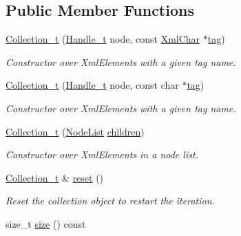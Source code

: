 \subsection*{Public Member Functions}
\begin{DoxyCompactItemize}
\item 
\hyperlink{class_d_d4hep_1_1_x_m_l_1_1_collection__t_a46561de1f154c3b06435766504b9d3db}{Collection\+\_\+t} (\hyperlink{class_d_d4hep_1_1_x_m_l_1_1_handle__t}{Handle\+\_\+t} node, const \hyperlink{namespace_d_d4hep_1_1_x_m_l_a09e5d9cc86ed782f6826dfe0778c1815}{Xml\+Char} $\ast$\hyperlink{class_d_d4hep_1_1_x_m_l_1_1_handle__t_ac935379eb28cd33bc36f19c68da66143}{tag})
\begin{DoxyCompactList}\small\item\em Constructor over Xml\+Elements with a given tag name. \end{DoxyCompactList}\item 
\hyperlink{class_d_d4hep_1_1_x_m_l_1_1_collection__t_a65effa5c14bd2aef11552cc9737022f9}{Collection\+\_\+t} (\hyperlink{class_d_d4hep_1_1_x_m_l_1_1_handle__t}{Handle\+\_\+t} node, const char $\ast$\hyperlink{class_d_d4hep_1_1_x_m_l_1_1_handle__t_ac935379eb28cd33bc36f19c68da66143}{tag})
\begin{DoxyCompactList}\small\item\em Constructor over Xml\+Elements with a given tag name. \end{DoxyCompactList}\item 
\hyperlink{class_d_d4hep_1_1_x_m_l_1_1_collection__t_a0db8adadf0bba07706766dbc027f5151}{Collection\+\_\+t} (\hyperlink{class_d_d4hep_1_1_x_m_l_1_1_node_list}{Node\+List} \hyperlink{class_d_d4hep_1_1_x_m_l_1_1_handle__t_aa27483dcfe272afb4ce560a5e45998f1}{children})
\begin{DoxyCompactList}\small\item\em Constructor over Xml\+Elements in a node list. \end{DoxyCompactList}\item 
\hyperlink{class_d_d4hep_1_1_x_m_l_1_1_collection__t}{Collection\+\_\+t} \& \hyperlink{class_d_d4hep_1_1_x_m_l_1_1_collection__t_adeb2667661d9b30037d28e6045068b00}{reset} ()
\begin{DoxyCompactList}\small\item\em Reset the collection object to restart the iteration. \end{DoxyCompactList}\item 
size\+\_\+t \hyperlink{class_d_d4hep_1_1_x_m_l_1_1_collection__t_add04429f77237942654dcab1852b6655}{size} () const

\end{DoxyCompactItemize}
